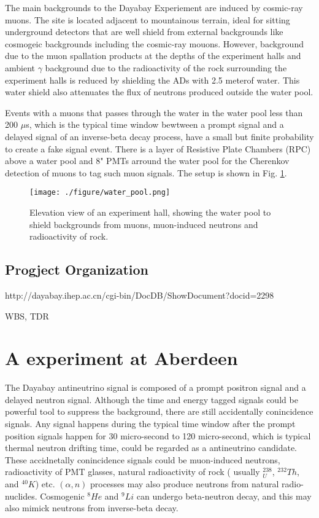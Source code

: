 The main backgrounds to the Dayabay Experiement are induced by cosmic-ray muons.
The site is located adjacent to mountainous terrain, ideal for sitting underground detectors that
are well shield from external backgrounds like cosmogeic backgrounds including the cosmic-ray mouons.
However, background due to the muon spallation products at the depths of the experiment halls and ambient
$\gamma$ background due to the radioactivity of the rock surrounding the experiment halls is reduced by shielding
the ADs with 2.5 meterof water. This water shield also attenuates the flux of neutrons produced outside the water
pool.

Events with a muons that passes through the water in the water pool less than 200 $\mu$s, which is the typical time window bewtween
a prompt signal and a delayed signal of an inverse-beta decay process, have a small but finite
probability to create a fake signal event.
There is a layer of  Resistive Plate Chambers (RPC) above a water pool
and 8" PMTs arround the water pool for the Cherenkov detection of muons to tag such muon signals.
The setup is shown in Fig. \ref{fig:water_pool.png}.


\begin{figure}[h]
    \centering
    \texttt{[image: ./figure/water\_pool.png]}
    \caption{Elevation view of an experiment hall,
showing the water pool to shield backgrounds from muons, muon-induced neutrons and radioactivity of rock.}
    \label{fig:water_pool.png}
    \end{figure}


\subsection{Progject Organization}

http://dayabay.ihep.ac.cn/cgi-bin/DocDB/ShowDocument?docid=2298

WBS, TDR



\section{A experiment at Aberdeen}

The Dayabay antineutrino signal is composed of a prompt positron signal and a delayed
neutron signal. Although the time and energy tagged signals could be powerful tool to suppress
the background, there are still accidentally conincidence signals. Any signal happens during
the typical time window after the prompt position signals happen for 30 micro-second to 120 micro-second,
which is typical thermal neutron drifting time, 
could be regarded as a antineutrino candidate. These accidnetally conincidence signals could be
muon-induced neutrons, radioactivity of PMT glasses, natural radioactivity of rock
( usually $^238_U$, $^232Th$, and $^40K$) etc. $(\alpha,n)$ processes may also produce
neutrons from natural radio-nuclides. Cosmogenic $^8He$ and $^9Li$ can undergo beta-neutron decay,
and this may also mimick neutrons from inverse-beta decay.

